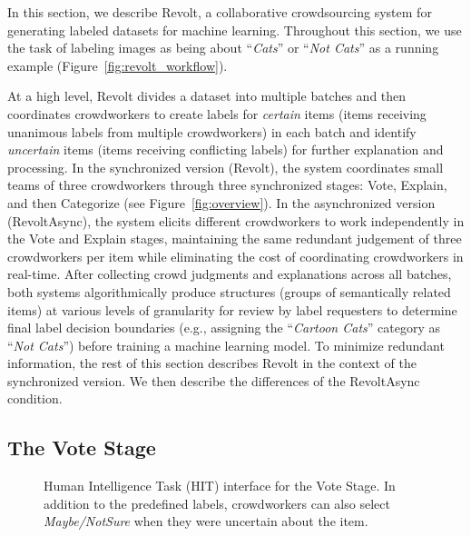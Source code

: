 In this section, we describe Revolt, a collaborative crowdsourcing system for generating labeled datasets for machine learning. Throughout this section, we use the task of labeling images as being about ``\emph{Cats}'' or ``\emph{Not Cats}'' as a running example (Figure~\ref{fig:revolt_workflow}).

At a high level, Revolt divides a dataset into multiple batches and then coordinates crowdworkers to create labels for \emph{certain} items (items receiving unanimous labels from multiple crowdworkers) in each batch and identify \emph{uncertain} items (items receiving conflicting labels) for further explanation and processing. In the synchronized version (Revolt), the system coordinates small teams of three crowdworkers through three synchronized stages: Vote, Explain, and then Categorize (see Figure~\ref{fig:overview}). In the asynchronized version (RevoltAsync), the system elicits different crowdworkers to work independently in the Vote and Explain stages, maintaining the same redundant judgement of three crowdworkers per item while eliminating the cost of coordinating crowdworkers in real-time. After collecting crowd judgments and explanations across all batches, both systems algorithmically produce structures (groups of semantically related items) at various levels of granularity for review by label requesters to determine final label decision boundaries (e.g., assigning the ``\emph{Cartoon Cats}'' category as ``\emph{Not Cats}'') before training a machine learning model. To minimize redundant information, the rest of this section describes Revolt in the context of the synchronized version. We then describe the differences of the RevoltAsync condition.


\subsection{The Vote Stage}

\begin{figure}[ht]
	\centering
	\caption[HIT interface for the Vote Stage of Revolt]{
	Human Intelligence Task (HIT) interface for the Vote Stage. In addition to the predefined labels, crowdworkers can also select \emph{Maybe/NotSure} when they were uncertain about the item. 
	}
	\label{fig:vote}
\end{figure}

